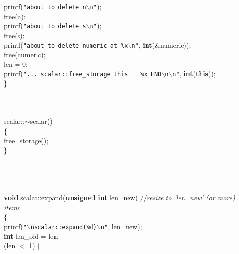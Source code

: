 \begin{flushleft}
\hspace*{4\indentation}printf({\tt"about to delete n$\backslash$n"});\mbox{}\\
\hspace*{4\indentation}free(n);\mbox{}\\
\hspace*{4\indentation}printf({\tt"about to delete s$\backslash$n"});\mbox{}\\
\hspace*{4\indentation}free(s);\mbox{}\\
\hspace*{4\indentation}printf({\tt"about to delete numeric at \%x$\backslash$n"}, {\bf int}(\&numeric));\mbox{}\\
\hspace*{4\indentation}free(numeric);\mbox{}\\
\hspace*{4\indentation}len = 0;\mbox{}\\
\hspace*{4\indentation}printf({\tt"... scalar::free\_storage this$=$ \%x END$\backslash$n$\backslash$n"}, {\bf int}({\bf this}));\mbox{}\\
\}\mbox{}\\
\mbox{}\\
\mbox{}\\
\mbox{}\\
scalar::$\sim$scalar()\mbox{}\\
\{\mbox{}\\
\hspace*{4\indentation}free\_storage();\mbox{}\\
\}\mbox{}\\
\mbox{}\\
\mbox{}\\
\mbox{}\\
\mbox{}\\
{\bf void} scalar::expand({\bf unsigned} {\bf int} len\_new) {$//$\it{}resize to 'len\_new' (or more) items{}\mbox{}\\
}\{\mbox{}\\
\hspace*{4\indentation}printf({\tt"$\backslash$nscalar::expand(\%d)$\backslash$n"}, len\_new);\mbox{}\\
\hspace*{4\indentation}{\bf unsigned} {\bf int} len\_old = len;\mbox{}\\
\hspace*{4\indentation}{\bf if} (len $<$ 1) \{\mbox{}\\

\end{flushleft}
